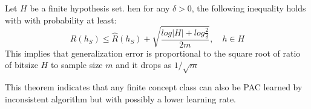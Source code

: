 \begin{theorem}

Let $H$ be a finite hypothesis set. hen for any $\delta >0$, the following inequality holds with with probability at least:
    $$
    R(h_S) \leq \hat{R}(h_S) + \sqrt{\frac{log |H| + log \frac{2}{\delta}}{2m}}, \quad h \in H
    $$    
    This implies that generalization error is proportional to the 
    square root of ratio of bitsize $H$ to sample size $m$ and it drops as $1/ \sqrt{m}$
\end{theorem}
This theorem indicates that any finite concept class can also be PAC learned by inconsistent algorithm but with possibly a lower learning rate. 